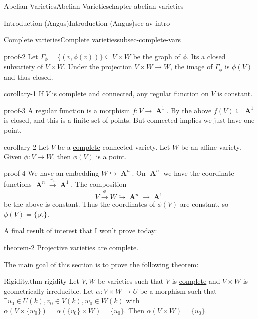\documentclass[oneside,10pt,]{book}
\numberwithin{equation}{section}
\DeclareMathOperator{\aff}{\mathbf{A}}
\begin{document}
\begin{chapterptx}{Abelian Varieties}{}{Abelian Varieties}{}{}{chapter-abelian-varieties}
\begin{sectionptx}{Introduction (Angus)}{}{Introduction (Angus)}{}{}{sec-av-intro}
\begin{subsectionptx}{Complete varieties}{}{Complete varieties}{}{}{subsec-complete-vars}
\begin{proofptx}{}{proof-2}
\hypertarget{p-22}{}%
Let \(\Gamma_\phi = \{(v, \phi(v))\} \subseteq V\times W\) be the graph of \(\phi\). Its a closed subvariety of \(V\times W\). Under the projection \(V\times W \to W\), the image of \(\Gamma_\phi\) is \(\phi(V)\) and thus closed.%
\end{proofptx}
\begin{corollary}{}{}{corollary-1}%
\hypertarget{p-23}{}%
If \(V\) is \hyperref[def-abelian-complete-var]{complete} and connected, any regular function on \(V\) is constant.%
\end{corollary}
\begin{proofptx}{}{proof-3}
\hypertarget{p-24}{}%
A regular function is a morphism \(f\colon V \to \aff^1\). By the above \(f(V) \subseteq \aff^1\) is closed, and this is a finite set of points. But connected implies we just have one point.%
\end{proofptx}
\begin{corollary}{}{}{corollary-2}%
\hypertarget{p-25}{}%
Let \(V \) be a \hyperref[def-abelian-complete-var]{complete} connected variety. Let \(W\) be an affine variety. Given \(\phi\colon V\to W\), then \(\phi (V)\) is a point.%
\end{corollary}
\begin{proofptx}{}{proof-4}
\hypertarget{p-26}{}%
We have an embedding \(W \hookrightarrow \aff^n\). On \(\aff^n\) we have the coordinate functions \(\aff^n \xrightarrow{x_i} \aff^1\). The composition%
\begin{equation*}
V \xrightarrow\phi W \hookrightarrow\aff^n \to \aff^1
\end{equation*}
be the above is constant. Thus the coordinates of \(\phi(V)\) are constant, so \(\phi(V) = \{\text{pt}\}\).%
\end{proofptx}
\hypertarget{p-27}{}%
A final result of interest that I won't prove today:%
\begin{theorem}{}{}{theorem-2}%
\hypertarget{p-28}{}%
Projective varieties are \hyperref[def-abelian-complete-var]{complete}.%
\end{theorem}
\hypertarget{p-29}{}%
The main goal of this section is to prove the following theorem:%
\begin{theorem}{Rigidity.}{}{thm-rigidity}%
\hypertarget{p-30}{}%
Let \(V,W\) be varieties such that \(V\) is \hyperref[def-abelian-complete-var]{complete} and  \(V\times W\) is geometrically irreducible. Let \(\alpha\colon V\times W \to U\) be a morphism such that \(\exists u_0\in U(k), v_0\in V(k), w_0\in W(k)\) with \(\alpha(V\times\{w_0\}) = \alpha (\{v_0\}\times W ) = \{u_0\}\). Then \(\alpha (V\times W) = \{u_0\}\).%

\end{theorem}
\end{subsectionptx}
\end{sectionptx}
\end{chapterptx}
\end{document}
